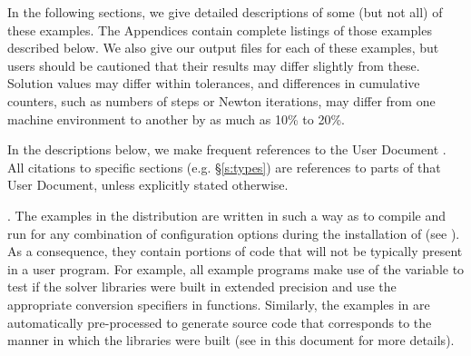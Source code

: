 \vspace{0.2in}\noindent 
In the following sections, we give detailed descriptions of some (but
not all) of these examples.  The Appendices contain complete listings
of those examples described below.  We also give our output files for
each of these examples, but users should be cautioned that their
results may differ slightly from these.  Solution
values may differ within tolerances, and differences in cumulative
counters, such as numbers of steps or Newton iterations, may differ
from one machine environment to another by as much as 10\% to 20\%.

In the descriptions below, we make frequent references to the {\ida}
User Document \cite{ida_ug}.  All citations to specific sections
(e.g. \S\ref{s:types}) are references to parts of that User Document, unless
explicitly stated otherwise.

\vspace{0.2in}. 
The examples in the {\ida} distribution are written in such a way as
to compile and run for any combination of configuration options during
the installation of {\sundials} (see ). As a consequence,
they contain portions of code that will not be typically present in a
user program. For example, all example programs make use of the
variable  to test if the solver libraries
were built in extended precision and use the appropriate conversion 
specifiers in  functions.  Similarly, the {\F} examples in
{\fida} are automatically pre-processed to generate source code that
corresponds to the manner in which the {\ida} libraries were built
(see  in this document for more details).
